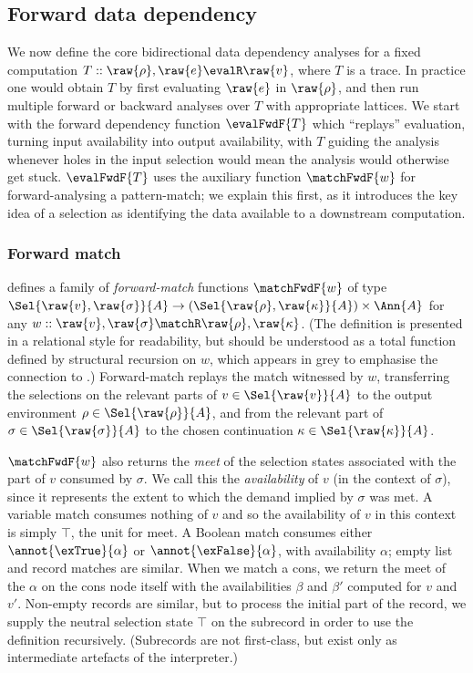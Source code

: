 \subsection{Forward data dependency}
\label{sec:data-dependencies:analyses:fwd}

We now define the core bidirectional data dependency analyses for a fixed computation $T :: \raw{\rho}, \raw{e} \evalR \raw{v}$, where $T$ is a trace. In practice one would obtain $T$ by first evaluating $\raw{e}$ in $\raw{\rho}$, and then run multiple forward or backward analyses over $T$ with appropriate lattices. We start with the forward dependency function $\evalFwdF{T}$ which ``replays'' evaluation, turning input availability into output availability, with $T$ guiding the analysis whenever holes in the input selection would mean the analysis would otherwise get stuck. $\evalFwdF{T}$ uses the auxiliary function $\matchFwdF{w}$ for forward-analysing a pattern-match; we explain this first, as it introduces the key idea of a selection as identifying the data available to a downstream computation.



\subsubsection{Forward match}
\label{sec:data-dependencies:analyses:fwd:pattern-match}

 defines a family of \emph{forward-match} functions $\matchFwdF{w}$ of type $\Sel{\raw{v}, \raw{\sigma}}{A} \to (\Sel{\raw{\rho}, \raw{\kappa}}{A}) \times \Ann{A}$ for any $w :: \raw{v}, \raw{\sigma} \matchR \raw{\rho}, \raw{\kappa}$. (The definition is presented in a relational style for readability, but should be understood as a total function defined by structural recursion on $w$, which appears in grey to emphasise the connection to .) Forward-match replays the match witnessed by $w$, transferring the selections on the relevant parts of $v \in \Sel{\raw{v}}{A}$ to the output environment $\rho \in \Sel{\raw{\rho}}{A}$, and from the relevant part of $\sigma \in \Sel{\raw{\sigma}}{A}$ to the chosen continuation $\kappa \in \Sel{\raw{\kappa}}{A}$.

$\matchFwdF{w}$ also returns the \emph{meet} of the selection states associated with the part of $v$ consumed by $\sigma$. We call this the \emph{availability} of $v$ (in the context of $\sigma$), since it represents the extent to which the demand implied by $\sigma$ was met. A variable match consumes nothing of $v$ and so the availability of $v$ in this context is simply $\top$, the unit for meet. A Boolean match consumes either $\annot{\exTrue}{\alpha}$ or $\annot{\exFalse}{\alpha}$, with availability $\alpha$; empty list and record matches are similar. When we match a cons, we return the meet of the $\alpha$ on the cons node itself with the availabilities $\beta$ and $\beta'$ computed for $v$ and $v'$. Non-empty records are similar, but to process the initial part of the record, we supply the neutral selection state $\top$ on the subrecord in order to use the definition recursively. (Subrecords are not first-class, but exist only as intermediate artefacts of the interpreter.)

